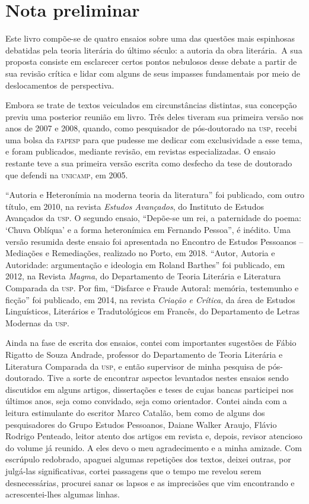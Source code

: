 \chapter*{Nota preliminar}

Este livro compõe-se de quatro ensaios sobre uma das questões mais espinhosas debatidas pela teoria literária do último século: a autoria da obra literária.~A sua proposta consiste em esclarecer certos pontos nebulosos desse debate a partir de sua revisão crítica e lidar com alguns de seus impasses fundamentais por meio de deslocamentos de perspectiva.

Embora se trate de textos veiculados em circunstâncias distintas, sua concepção previu uma posterior reunião em livro. Três deles tiveram sua primeira versão nos anos de 2007 e 2008, quando, como pesquisador de pós-doutorado na \textsc{usp}, recebi uma bolsa da \textsc{fapesp} para que pudesse me dedicar com exclusividade a esse tema, e foram publicados, mediante revisão, em revistas especializadas. O ensaio restante teve a sua primeira versão escrita como desfecho da tese de doutorado que defendi na \textsc{unicamp}, em 2005.

``Autoria e Heteronímia na moderna teoria da literatura'' foi publicado, com outro título, em 2010, na revista \emph{Estudos Avançados}, do Instituto de Estudos Avançados da \textsc{usp}. O segundo ensaio, ``Depõe-se um rei, a paternidade do poema: `Chuva Oblíqua' e a forma heteronímica em Fernando Pessoa'', é inédito. Uma versão resumida deste ensaio foi apresentada no Encontro de Estudos Pessoanos -- Mediações e Remediações, realizado no Porto, em 2018.  ``Autor, Autoria e Autoridade: argumentação e ideologia em Roland Barthes'' foi publicado, em 2012, na Revista \emph{Magma}, do Departamento de Teoria Literária e Literatura Comparada da \textsc{usp}. Por fim, ``Disfarce e Fraude Autoral: memória, testemunho e ficção'' foi publicado, em 2014, na revista \emph{Criação e Crítica}, da área de Estudos Linguísticos, Literários e Tradutológicos em Francês, do Departamento de Letras Modernas da \textsc{usp}. 

Ainda na fase de escrita dos ensaios, contei com importantes sugestões de Fábio Rigatto de Souza Andrade, professor do Departamento de Teoria Literária e Literatura Comparada da \textsc{usp}, e então supervisor de minha pesquisa de pós-doutorado. Tive a sorte de encontrar aspectos levantados nestes ensaios sendo discutidos em alguns artigos, dissertações e teses de cujas bancas participei nos últimos anos, seja como convidado, seja como orientador. Contei ainda com a leitura estimulante do escritor Marco Catalão, bem como de alguns dos pesquisadores do Grupo Estudos Pessoanos, Daiane Walker Araujo, Flávio Rodrigo Penteado, leitor atento dos artigos em revista e, depois, revisor atencioso do volume já reunido. A eles devo o meu agradecimento e a minha amizade. Com escrúpulo redobrado, apaguei algumas repetições dos textos, deixei outras, por julgá-las significativas, cortei passagens que o tempo me revelou serem desnecessárias, procurei sanar os lapsos e as imprecisões que vim encontrando e acrescentei-lhes algumas linhas. 

